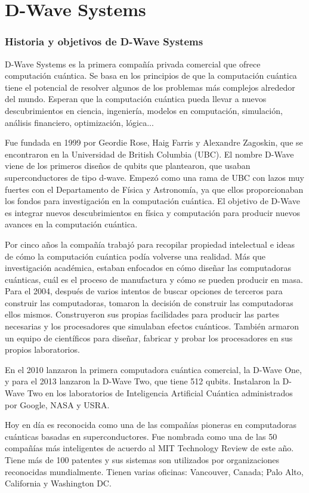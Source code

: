 \documentclass[11pt,a4paper]{article}
\begin{document}
\part{D-Wave Systems}
\section*{Historia y objetivos de D-Wave Systems}

D-Wave Systems es la primera compañía privada comercial que ofrece computación cuántica. Se basa en los principios de que la computación cuántica tiene el potencial de resolver algunos de los problemas más complejos alrededor del mundo. Esperan que la computación cuántica pueda llevar a nuevos descubrimientos en ciencia, ingeniería, modelos en computación, simulación, análisis financiero, optimización, lógica...

Fue fundada en 1999 por Geordie Rose, Haig Farris y Alexandre Zagoskin, que se encontraron en la Universidad de British Columbia (UBC). El nombre D-Wave viene de los primeros diseños de qubits que plantearon, que usaban superconductores de tipo d-wave. Empezó como una rama de UBC con lazos muy fuertes con el Departamento de Física y Astronomía, ya que ellos proporcionaban los fondos para investigación en la computación cuántica. El objetivo de D-Wave es integrar nuevos descubrimientos en física y computación para producir nuevos avances en la computación cuántica.

Por cinco años la compañía trabajó para recopilar propiedad intelectual e ideas de cómo la computación cuántica podía volverse una realidad. Más que investigación académica, estaban enfocados en cómo diseñar las computadoras cuánticas, cuál es el proceso de manufactura y cómo se pueden producir en masa. 
Para el 2004, después de varios intentos de buscar opciones de terceros para construir las computadoras, tomaron la decisión de construir las computadoras ellos mismos. Construyeron sus propias facilidades para producir las partes necesarias y los procesadores que simulaban efectos cuánticos. También armaron un equipo de científicos para diseñar, fabricar y probar los procesadores en sus propios laboratorios. 

En el 2010 lanzaron la primera computadora cuántica comercial, la D-Wave One, y para el 2013 lanzaron la D-Wave Two, que tiene 512 qubits. Instalaron la D-Wave Two en los laboratorios de Inteligencia Artificial Cuántica administrados por Google, NASA y USRA. 

Hoy en día es reconocida como una de las compañías pioneras en computadoras cuánticas basadas en superconductores. Fue nombrada como una de las 50 compañías más inteligentes de acuerdo al MIT Technology Review de este año. Tiene más de 100 patentes y sus sistemas son utilizados por organizaciones reconocidas mundialmente. Tienen varias oficinas: Vancouver, Canada; Palo Alto, California y Washington DC. 
\end{document}
